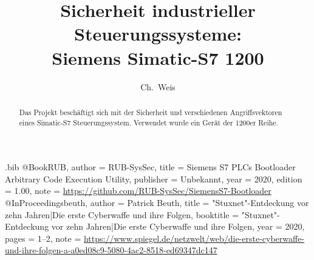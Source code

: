 \usepackage{filecontents}

\begin{filecontents}{\jobname.bib}
@Book{RUB,
  author =       {RUB-SysSec},
  title =        {Siemens S7 PLCs Bootloader Arbitrary Code Execution Utility},
  publisher =    {Unbekannt},
  year =         2020,
  edition =      {1.00},
  note =         {\url{https://github.com/RUB-SysSec/SiemensS7-Bootloader}}
}
@InProceedings{beuth,
  author =       {Patrick Beuth},
  title =        {{"Stuxnet"-Entdeckung vor zehn Jahren|Die erste Cyberwaffe und ihre Folgen}},
  booktitle =    {{"Stuxnet"-Entdeckung vor zehn Jahren|Die erste Cyberwaffe und ihre Folgen}},
  year =         2020,
  pages =        {1--2},
  note =         {\url{https://www.spiegel.de/netzwelt/web/die-erste-cyberwaffe-und-ihre-folgen-a-a0ed08c9-5080-4ac2-8518-ed69347dc147}}}
\end{filecontents}



\date{}

\title{\Large \bf Sicherheit industrieller Steuerungssysteme:\\
  Siemens Simatic-S7 1200}

\author{
{\rm  Ch.\ Weis}\\
} %

\maketitle

\begin{abstract}
Das Projekt beschäftigt sich mit der Sicherheit und verschiedenen Angriffsvektoren eines Simatic-S7 Steuerungssystem.
Verwendet wurde ein Gerät der 1200er Reihe.
\end{abstract}


